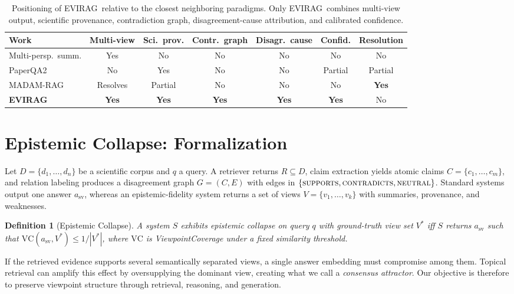\documentclass[11pt]{article}
\newcommand{\system}{\textsc{EVIRAG}\xspace}
\newtheorem{definition}{Definition}
\begin{document}
\begin{table}[t]
\centering\small
\setlength{\tabcolsep}{5pt}
\begin{tabular}{@{}lcccccc@{}}
\toprule
\textbf{Work} & \textbf{Multi-view} & \textbf{Sci.\ prov.} & \textbf{Contr.\ graph} & \textbf{Disagr.\ cause} & \textbf{Confid.} & \textbf{Resolution} \\
\midrule
Multi-persp.\ summ. & Yes & No & No & No & No & No \\
PaperQA2 & No & Yes & No & No & Partial & Partial \\
MADAM-RAG & Resolves & Partial & No & No & No & \textbf{Yes} \\
\textbf{\system} & \textbf{Yes} & \textbf{Yes} & \textbf{Yes} & \textbf{Yes} & \textbf{Yes} & No \\
\bottomrule
\end{tabular}
\caption{Positioning of \system\ relative to the closest neighboring paradigms.
Only \system\ combines multi-view output, scientific provenance, contradiction
graph, disagreement-cause attribution, and calibrated confidence.}
\label{tab:rw-compare}
\end{table}

\section{Epistemic Collapse: Formalization}
\label{sec:formalization}

Let $D = \{d_1, \ldots, d_n\}$ be a scientific corpus and $q$ a query.  A
retriever returns $R \subseteq D$, claim extraction yields atomic claims
$C = \{c_1, \ldots, c_m\}$, and relation labeling produces a disagreement graph
$G = (C, E)$ with edges in
$\{\textsc{supports},\textsc{contradicts},\textsc{neutral}\}$.  Standard
systems output one answer $a_\mathrm{sv}$, whereas an epistemic-fidelity system
returns a set of views $V=\{v_1,\ldots,v_k\}$ with summaries, provenance, and
weaknesses.

\begin{definition}[Epistemic Collapse]
\label{def:collapse}
A system $S$ exhibits \emph{epistemic collapse} on query $q$ with
ground-truth view set $V^*$ iff $S$ returns $a_\mathrm{sv}$ such that
$\mathrm{VC}(a_\mathrm{sv}, V^*) \leq 1/|V^*|$, where $\mathrm{VC}$ is
ViewpointCoverage under a fixed similarity threshold.
\end{definition}

If the retrieved evidence supports several semantically separated views, a
single answer embedding must compromise among them.  Topical retrieval can
amplify this effect by oversupplying the dominant view, creating what we call a
\emph{consensus attractor}.  Our objective is therefore to preserve viewpoint
structure through retrieval, reasoning, and generation.
\end{document}
